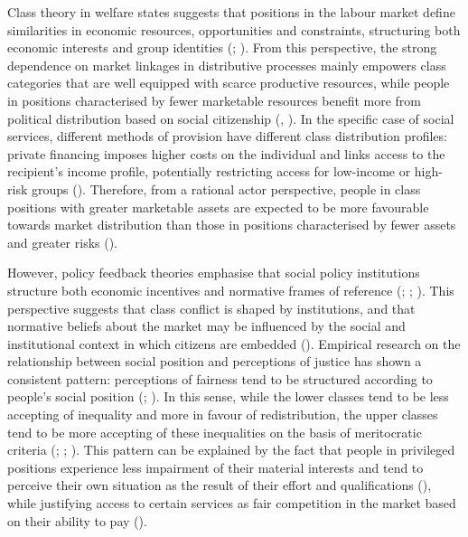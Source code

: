 \documentclass[
  12pt,
]{article}
\begin{document}
Class theory in welfare states suggests that positions in the labour
market define similarities in economic resources, opportunities and
constraints, structuring both economic interests and group identities
(;
). From this
perspective, the strong dependence on market linkages in distributive
processes mainly empowers class categories that are well equipped with
scarce productive resources, while people in positions characterised by
fewer marketable resources benefit more from political distribution
based on social citizenship (, ). In the specific case
of social services, different methods of provision have different class
distribution profiles: private financing imposes higher costs on the
individual and links access to the recipient's income profile,
potentially restricting access for low-income or high-risk groups
(). Therefore, from a
rational actor perspective, people in class positions with greater
marketable assets are expected to be more favourable towards market
distribution than those in positions characterised by fewer assets and
greater risks
().

However, policy feedback theories emphasise that social policy
institutions structure both economic incentives and normative frames of
reference (;
;
). This
perspective suggests that class conflict is shaped by institutions, and
that normative beliefs about the market may be influenced by the social
and institutional context in which citizens are embedded
(). Empirical
research on the relationship between social position and perceptions of
justice has shown a consistent pattern: perceptions of fairness tend to
be structured according to people's social position
(;
). In this
sense, while the lower classes tend to be less accepting of inequality
and more in favour of redistribution, the upper classes tend to be more
accepting of these inequalities on the basis of meritocratic criteria
(;
;
). This
pattern can be explained by the fact that people in privileged positions
experience less impairment of their material interests and tend to
perceive their own situation as the result of their effort and
qualifications
(), while
justifying access to certain services as fair competition in the market
based on their ability to pay
().
\end{document}
